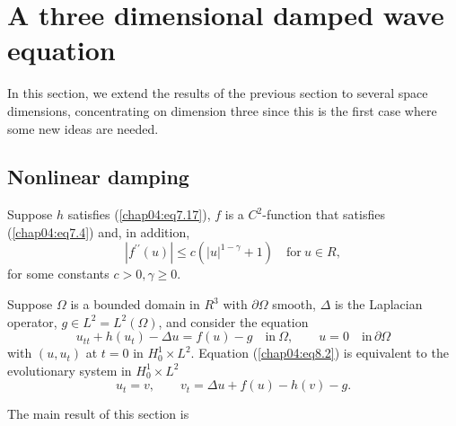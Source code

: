 \documentclass{surv-l}
\theoremstyle{plain}
\theoremstyle{definition}
\numberwithin{equation}{section}
\numberwithin{figure}{chapter}
\begin{document}
\section{A three dimensional damped wave equation}\label{sec4.8}

In this section, we extend the results of the previous section to several space dimensions, concentrating on dimension three since this is the first case where some new ideas are needed.

\subsection{Nonlinear damping}\label{subsec4.8.1} Suppose $h$ satisfies (\ref{chap04:eq7.17}), $f$ is a $C^{2}$-function that satisfies (\ref{chap04:eq7.4}) and, in addition,
\begin{equation}\label{chap04:eq8.1}
|f^{\prime\prime}(u)|\leq c(|u|^{1-\gamma}+1)\quad \mathrm{for}\ u\in R,
\end{equation}
for some constants $c>0, \gamma\geq 0$.

Suppose $\Omega$ is a bounded domain in $R^{3}$ with $\partial\Omega$ smooth, $\Delta$ is the Laplacian operator, $g\in L^{2}=L^{2}(\Omega)$, and consider the equation
\begin{equation}\label{chap04:eq8.2}
u_{tt}+h(u_{t})-\Delta u=f(u)-g\quad \mathrm{in}\ \Omega,\quad\quad u=0\quad \mathrm{in}\, \partial\Omega
\end{equation}
with $(u, u_{t})$ at $t=0$ in $H_{0}^{1} \times L^{2}$. Equation (\ref{chap04:eq8.2}) is equivalent to the evolutionary system in $H_{0}^{1}\times L^{2}$
\begin{equation}\label{chap04:eq8.3}
u_{t}=v,\quad\quad v_{t}=\Delta u+f(u)-h(v)-g.
\end{equation}

The main result of this section is
\end{document}
